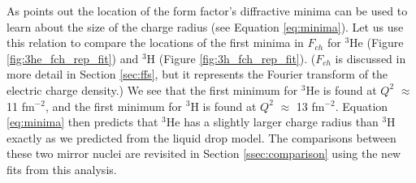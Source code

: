 
As \cite{Book:Povh} points out the location of the form factor's diffractive minima can be used to learn about the size of the charge radius (see Equation \ref{eq:minima}). Let us use this relation to compare the locations of the first minima in $F_{ch}$ for $^3$He (Figure \ref{fig:3he_fch_rep_fit}) and $^3$H (Figure \ref{fig:3h_fch_rep_fit}). ($F_{ch}$ is discussed in more detail in Section \ref{sec:ffs}, but it represents the Fourier transform of the electric charge density.) We see that the first minimum for $^3$He is found at $Q^2$ $\approx$ 11 fm$^{-2}$, and the first minimum for $^3$H is found at $Q^2$ $\approx$ 13 fm$^{-2}$. Equation \ref{eq:minima} then predicts that $^3$He has a slightly larger charge radius than $^3$H exactly as we predicted from the liquid drop model. The comparisons between these two mirror nuclei are revisited in Section \ref{ssec:comparison} using the new fits from this analysis.

 

